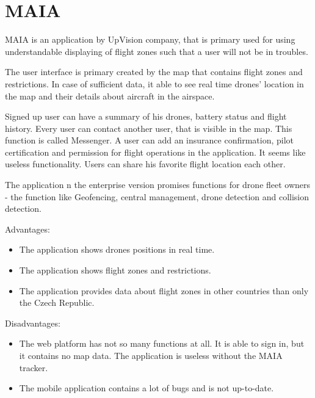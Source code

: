 \section{MAIA}\label{sec:maia}
MAIA is an application by UpVision company, that is primary used for using understandable displaying of flight zones such that a user will not be in troubles.\cite{maia}

The user interface is primary created by the map that contains flight zones and restrictions.
In case of sufficient data, it able to see real time drones' location in the map and their details about aircraft in the airspace.

Signed up user can have a summary of his drones, battery status and flight history.
Every user can contact another user, that is visible in the map.
This function is called Messenger.
A user can add an insurance confirmation, pilot certification and permission for flight operations in the application.
It seems like useless functionality.
Users can share his favorite flight location each other.

The application n the enterprise version promises functions for drone fleet owners - the function like Geofencing, central management, drone detection and collision detection.

Advantages:
\begin{itemize}
    \item The application shows drones positions in real time.
    \item The application shows flight zones and restrictions.
    \item The application provides data about flight zones in other countries than only the Czech Republic.
\end{itemize}
Disadvantages:
\begin{itemize}
    \item The web platform has not so many functions at all.
    It is able to sign in, but it contains no map data.
    The application is useless without the MAIA tracker.
    \item The mobile application contains a lot of bugs and is not up-to-date.
\end{itemize}